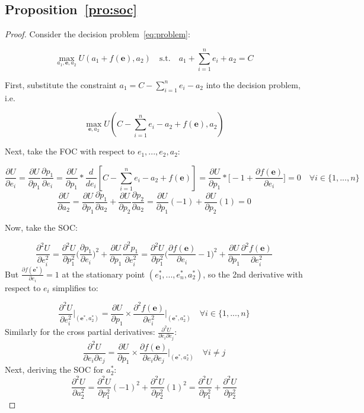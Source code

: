 \subsection{Proposition~\ref{pro:soc}}
\label{app:soc}
\begin{proof}
Consider the decision problem~\ref{eq:problem}:

$$\max_{a_1,\mathbf{e},a_2} U(a_1+f(\mathbf{e}),a_2) 
\quad \text{s.t.} \quad a_1 + \sum_{i=1}^n e_i + a_2 = C$$

First, substitute the constraint $a_1=C-\sum_{i=1}^n e_i-a_2$ into the decision problem, i.e.

$$\max_{\mathbf{e},a_2} U(C-\sum_{i=1}^n e_i-a_2+f(\mathbf{e}),a_2)$$

Next, take the FOC with respect to $e_1,...,e_2,a_2$:

$$\frac{\partial U}{\partial e_i}=\frac{\partial U}{\partial p_1}\frac{\partial p_1}{\partial e_i}=\frac{\partial U}{\partial p_1}*\frac{d}{de_i}[C-\sum_{i=1}^n e_i-a_2+f(\mathbf{e})]=\frac{\partial U}{\partial p_1}*\bigg[-1+\frac{\partial f(\mathbf{e})}{\partial e_i}\bigg]=0\quad\forall i\in\{1,...,n\}$$
$$\frac{\partial U}{\partial a_2}=\frac{\partial U}{\partial p_1}\frac{\partial p_1}{\partial a_2}+\frac{\partial U}{\partial p_2}\frac{\partial p_2}{\partial a_2}=\frac{\partial U}{\partial p_1}(-1)+\frac{\partial U}{\partial p_2}(1)=0$$

Now, take the SOC:

$$\frac{\partial^2 U}{\partial e_i^2}=\frac{\partial^2 U}{\partial p_1^2}\bigg(\frac{\partial p_1}{\partial e_i}\bigg)^2+\frac{\partial U}{\partial p_1}\frac{\partial^2 p_1}{\partial e_i^2}=\frac{\partial^2 U}{\partial p_1^2}\bigg(\frac{\partial f(\mathbf{e})}{\partial e_i}-1\bigg)^2+\frac{\partial U}{\partial p_1}\frac{\partial^2 f(\mathbf{e})}{\partial e_i^2}$$
But $\frac{\partial f(\mathbf{e^*})}{\partial e_i}=1$ at the stationary point $(e_1^*,...,e^*_n,a_2^*)$, so the 2nd derivative with respect to $e_i$ simplifies to:

$$\frac{\partial^2 U}{\partial e_i^2}\bigg|_{(\mathbf{e}^*,a^*_2)}=\frac{\partial U}{\partial p_1}\times\frac{\partial^2 f(\mathbf{e})}{\partial e_i^2}\bigg|_{(\mathbf{e}^*,a^*_2)}\quad\forall i\in\{1,...,n\}$$
Similarly for the cross partial derivatives: $\frac{\partial^2 U}{\partial e_i\partial e_j}$:
$$\frac{\partial^2 U}{\partial e_i\partial e_j}=\frac{\partial U}{\partial p_1}\times\frac{\partial f(\mathbf{e})}{\partial e_i\partial e_j}\bigg|_{(\mathbf{e}^*,a^*_2)}\quad\forall i\neq j$$
Next, deriving the SOC for $a^*_2$:
$$\frac{\partial^2 U}{\partial a_2^2}=\frac{\partial^2 U}{\partial p_1^2}(-1)^2+\frac{\partial^2 U}{\partial p_2^2}(1)^2=\frac{\partial^2 U}{\partial p_1^2}+\frac{\partial^2 U}{\partial p_2^2}$$


\end{proof}
